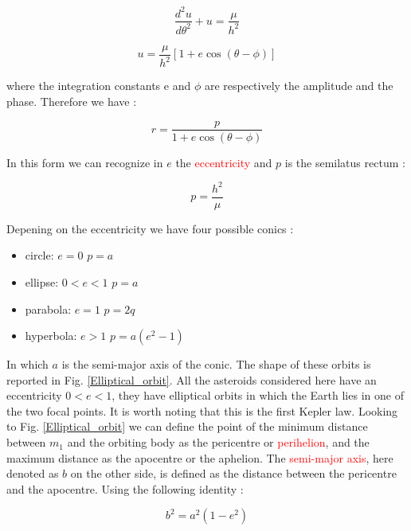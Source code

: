 \documentclass[12pt,%
               a4paper,%
               oneside,openany,%
               titlepage,%
               headinclude,footinclude,%
               BCOR5mm,%
               cleardoublepage=empty,%
               tablecaptionabove,%
               floatperchapter,
               ]{scrreprt}                 %
\begin{document}
\begin{equation}
\dfrac{d^{2}u}{d\theta^{2}}+u=\frac{\mu}{h^{2}}
\end{equation}

\begin{equation}
u=\frac{\mu}{h^{2}}\left[1+e\cos(\theta-\phi)\right]
\end{equation}

where the integration constants e and $\phi$ are respectively the amplitude and the phase. Therefore we have \cite{murray1999solar}:

\begin{equation}
r=\dfrac{p}{1+e\cos(\theta-\phi)}
\end{equation}

In this form we can recognize in $e$ the \textcolor{red}{eccentricity} and $p$ is the semilatus rectum \cite{murray1999solar}:

\begin{equation}
p=\frac{h^{2}}{\mu}
\end{equation}

Depening on the eccentricity we have four possible conics \cite{murray1999solar}:

\begin{itemize}
\item circle:  $e=0$ \quad $p=a$
\item ellipse: $0<e<1$ \quad $p=a$
\item parabola: $e=1$ \quad $p=2q$
\item hyperbola: $e>1$ \quad $p=a(e^{2}-1)$
\end{itemize}

In which $a$ is the semi-major axis of the conic. The shape of these orbits is reported in Fig. \ref{Elliptical_orbit}. All the asteroids considered here have an eccentricity $0<e<1$, they have elliptical orbits in which the Earth lies in one of the two focal points. It is worth noting that this is the first Kepler law.  Looking to Fig. \ref{Elliptical_orbit} we can define the point of the minimum distance between $m_{1}$ and the orbiting body as the pericentre or \textcolor{red}{perihelion}, and the maximum distance as the apocentre or the aphelion. The \textcolor{red}{semi-major axis}, here denoted as $b$ on the other side, is defined as the distance between the pericentre and the apocentre. Using the following identity \cite{murray1999solar}:

\begin{equation}
b^{2}=a^{2}(1-e^{2})
\end{equation}
\end{document}
